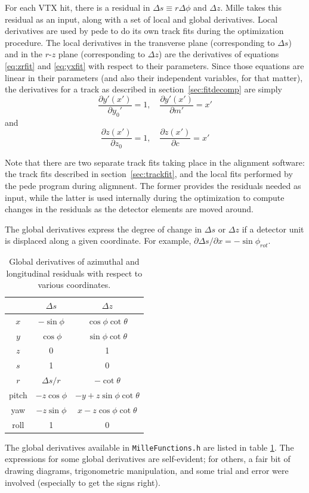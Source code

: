 \documentclass[12pt]{article}
\begin{document}
For each VTX hit, there is a residual in $\Delta s \equiv r\Delta\phi$ and $\Delta z$. Mille takes this residual as an input, along with a set of local and global derivatives. Local derivatives are used by pede to do its own track fits during the optimization procedure. The local derivatives in the transverse plane (corresponding to $\Delta s$) and in the $r$-$z$ plane (corresponding to $\Delta z$) are the derivatives of equations \ref{eq:zrfit} and \ref{eq:yxfit} with respect to their parameters. Since those equations are linear in their parameters (and also their independent variables, for that matter), the derivatives for a track as described in section~\ref{sec:fitdecomp} are simply
\begin{equation} \label{eq:sderlc}
\frac{\partial y'(x')}{\partial y_0'} = 1, \quad 
\frac{\partial y'(x')}{\partial m'} = x' 
\end{equation}
and
\begin{equation} \label{eq:zderlc}
\frac{\partial z(x')}{\partial z_0} = 1, \quad 
\frac{\partial z(x')}{\partial c} = x' 
\end{equation}

Note that there are two separate track fits taking place in the alignment software: the track fits described in section~\ref{sec:trackfit}, and the local fits performed by the pede program during aligmnent. The former provides the residuals needed as input, while the latter is used internally during the optimization to compute changes in the residuals as the detector elements are moved around.

The global derivatives express the degree of change in $\Delta s$ or $\Delta z$ if a detector unit is displaced along a given coordinate. For example, $\partial \Delta s / \partial x = -\sin \phi_{rot}$. 
\begin{table}[htb!]
\centering
\begin{tabular}{c | c | c }
 & $\Delta s$ & $\Delta z$ \\
\hline
$x$ & $-\sin \phi$ & $\cos \phi \cot \theta$ \\
$y$ & $ \cos \phi$ & $\sin \phi \cot \theta$ \\
$z$ & 0 & 1 \\
$s$ & 1 & 0 \\
$r$ & $\Delta s / r$ & $-\cot \theta$ \\
pitch & $-z \cos \phi$ & $-y + z \sin \phi \cot \theta$ \\
yaw & $-z \sin \phi$ & $x - z \cos \phi \cot \theta$ \\
roll & 1 & 0 \\
\hline
\end{tabular}
\caption{Global derivatives of azimuthal and longitudinal residuals with respect to various coordinates.}
\label{tab:dergl}
\end{table}
The global derivatives available in \texttt{MilleFunctions.h} are listed in table \ref{tab:dergl}. The expressions for some global derivatives are self-evident; for others, a fair bit of drawing diagrams, trigonometric manipulation, and some trial and error were involved (especially to get the signs right).
\end{document}
